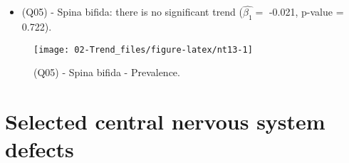 \documentclass[
]{krantz}
\providecommand{\tightlist}{%
  \setlength{\itemsep}{0pt}\setlength{\parskip}{0pt}}
\begin{document}
\begin{itemize}
\tightlist
\item
  (Q05) - Spina bifida: there is no significant trend (\(\hat{\beta_{1}} =\) -0.021, p-value = 0.722).
\end{itemize}

\begin{figure}[h]

{\centering \texttt{[image: 02-Trend\_files/figure-latex/nt13-1]} 

}

\caption{(Q05) - Spina bifida - Prevalence.}\label{fig:nt13}
\end{figure}

\clearpage

\hypertarget{section33}{%
\section{Selected central nervous system defects}\label{section33}}
\end{document}
